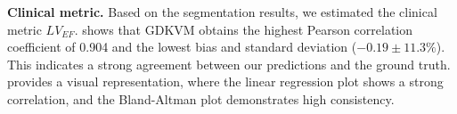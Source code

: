
\noindent
\textbf{Clinical metric.}
Based on the segmentation results, we estimated the clinical metric $LV_{EF}$.  shows that GDKVM obtains the highest Pearson correlation coefficient of 0.904 and the lowest bias and standard deviation ($-0.19 \pm 11.3\%$). This indicates a strong agreement between our predictions and the ground truth.  provides a visual representation, where the linear regression plot shows a strong correlation, and the Bland-Altman plot demonstrates high consistency.